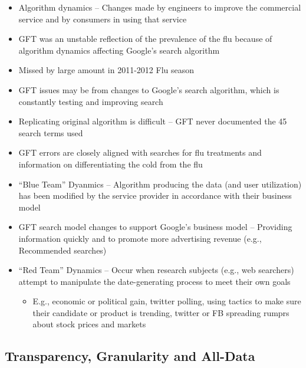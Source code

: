 \documentclass[
]{book}
\providecommand{\tightlist}{%
  \setlength{\itemsep}{0pt}\setlength{\parskip}{0pt}}
\begin{document}
\begin{itemize}
\item
  Algorithm dynamics -- Changes made by engineers to improve the commercial service and by consumers in using that service
\item
  GFT was an unstable reflection of the prevalence of the flu because of algorithm dynamics affecting Google's search algorithm
\item
  Missed by large amount in 2011-2012 Flu season
\item
  GFT issues may be from changes to Google's search algorithm, which is constantly testing and improving search
\item
  Replicating original algorithm is difficult -- GFT never documented the 45 search terms used
\item
  GFT errors are closely aligned with searches for flu treatments and information on differentiating the cold from the flu
\item
  ``Blue Team'' Dyanmics -- Algorithm producing the data (and user utilization) has been modified by the service provider in accordance with their business model
\item
  GFT search model changes to support Google's business model -- Providing information quickly and to promote more advertising revenue (e.g., Recommended searches)
\item
  ``Red Team'' Dynamics -- Occur when research subjects (e.g., web searchers) attempt to manipulate the date-generating process to meet their own goals

  \begin{itemize}
  \tightlist
  \item
    E.g., economic or political gain, twitter polling, using tactics to make sure their candidate or product is trending, twitter or FB spreading rumprs about stock prices and markets
  \end{itemize}
\end{itemize}

\subsection{Transparency, Granularity and All-Data}\label{transparency-granularity-and-all-data}
\end{document}
